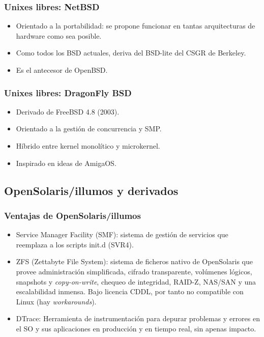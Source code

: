 \documentclass{beamer}
\begin{document}

\begin{frame}
\frametitle{Unixes libres: NetBSD}

\begin{itemize}
\item Orientado a la portabilidad: se propone funcionar en tantas arquitecturas de hardware como sea posible.
\item Como todos los BSD actuales, deriva del BSD-lite del CSGR de Berkeley.
\item Es el antecesor de OpenBSD.
\end{itemize}

\end{frame}


\begin{frame}
\frametitle{Unixes libres: DragonFly BSD}

\begin{itemize}
\item Derivado de FreeBSD 4.8 (2003). 
\item Orientado a la gestión de concurrencia y SMP.
\item Híbrido entre kernel monolítico y microkernel.
\item Inspirado en ideas de AmigaOS.
\end{itemize}

\end{frame}


\subsection{OpenSolaris/illumos y derivados}

\begin{frame}
\frametitle{Ventajas de OpenSolaris/illumos}

\begin{itemize}
\item \alert{Service Manager Facility} (SMF): sistema de gestión de servicios que reemplaza a los scripts init.d (SVR4).
\item \alert{ZFS} (Zettabyte File System): sistema de ficheros nativo de OpenSolaris que provee administración simplificada, cifrado transparente, volúmenes lógicos, snapshots y \textit{copy-on-write}, chequeo de integridad, RAID-Z, NAS/SAN y una escalabilidad inmensa. Bajo licencia CDDL, por tanto no compatible con Linux (hay \textit{workarounds}).
\item \alert{DTrace:} Herramienta de instrumentación para depurar problemas y errores en el SO y sus aplicaciones en producción y en tiempo real, sin apenas impacto.
\end{itemize}

\end{frame}
\end{document}
